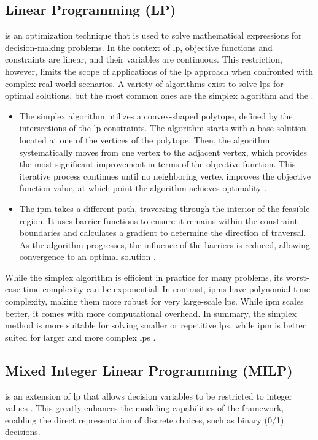 \subsection{Linear Programming (LP)}
 is an optimization technique that is used to solve mathematical expressions for decision-making problems.
In the context of \gls{lp}, objective functions and constraints are linear, and their variables are continuous.
This restriction, however, limits the scope of applications of the \gls{lp} approach when confronted with complex real-world scenarios.
A variety of algorithms exist to solve \glspl{lp} for optimal solutions, but the most common ones are the simplex algorithm and the  \cite{boyd_convex_2004}.

\begin{itemize}
    \item The simplex algorithm utilizes a convex-shaped polytope, defined by the intersections of the \gls{lp} constraints.
    The algorithm starts with a base solution located at one of the vertices of the polytope.
    Then, the algorithm systematically moves from one vertex to the adjacent vertex, which provides the most significant improvement in terms of the objective function.
    This iterative process continues until no neighboring vertex improves the objective function value, at which point the algorithm achieves optimality \cite{boyd_convex_2004}.
    \item The \gls{ipm} takes a different path, traversing through the interior of the feasible region.
    It uses barrier functions to ensure it remains within the constraint boundaries and calculates a gradient to determine the direction of traversal.
    As the algorithm progresses, the influence of the barriers is reduced, allowing convergence to an optimal solution \cite{boyd_convex_2004}.
\end{itemize}

While the simplex algorithm is efficient in practice for many problems, its worst-case time complexity can be exponential.
In contrast, \glspl{ipm} have polynomial-time complexity, making them more robust for very large-scale \glspl{lp}.
While \gls{ipm} scales better, it comes with more computational overhead.
In summary, the simplex method is more suitable for solving smaller or repetitive \glspl{lp}, while \gls{ipm} is better suited for larger and more complex \glspl{lp} \cite{boyd_convex_2004}.


\subsection{Mixed Integer Linear Programming (MILP)}
 is an extension of \gls{lp} that allows decision variables to be restricted to integer values \cite{vielma_mixed_2015}.
This greatly enhances the modeling capabilities of the framework, enabling the direct representation of discrete choices, such as binary (0/1) decisions.

